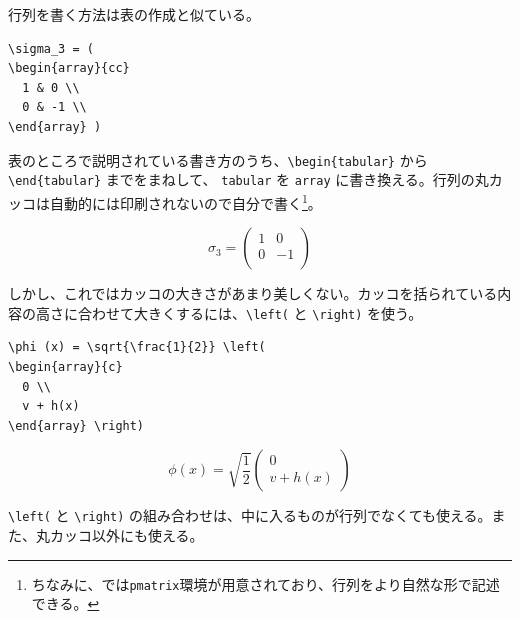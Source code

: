 行列を書く方法は表の作成と似ている。
\begin{reidai}
\begin{verbatim}
\sigma_3 = (
\begin{array}{cc}
  1 & 0 \\
  0 & -1 \\
\end{array} )
\end{verbatim}
\end{reidai} \noindent
表のところで説明されている書き方のうち、\verb|\begin{tabular}| から\verb|\end{tabular}| までをまねして、 \texttt{tabular} を \texttt{array} に書き換える。行列の丸カッコは自動的には印刷されないので自分で書く\footnote{ちなみに、\AmSLaTeX では{\tt pmatrix}環境が用意されており、行列をより自然な形で記述できる。}。
\begin{kekka}
  \begin{equation*}
    \sigma_3 = (
    \begin{array}{cc}
      1 & 0 \\
      0 & -1 \\
    \end{array} )
  \end{equation*}
  \vspace{0pt}
\end{kekka} \noindent
しかし、これではカッコの大きさがあまり美しくない。カッコを括られている内容の高さに合わせて大きくするには、\verb|\left(| と \verb|\right)| を使う。
\begin{reidai}
\begin{verbatim}
\phi (x) = \sqrt{\frac{1}{2}} \left(
\begin{array}{c}
  0 \\
  v + h(x)
\end{array} \right)
\end{verbatim}
\end{reidai} \noindent
\vspace*{-1.5em}
\begin{kekka}
  \begin{equation}
    \phi (x) = \sqrt{\frac{1}{2}} \left(
      \begin{array}{c}
        0 \\
        v + h(x)
      \end{array} \right)
  \end{equation}
  \vspace{0pt}
\end{kekka} \noindent
\verb|\left(| と \verb|\right)| の組み合わせは、中に入るものが行列でなくても使える。また、丸カッコ以外にも使える。
